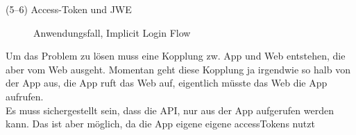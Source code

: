 \begin{labeling}{(5--6) Access-Token und JWE}


\end{labeling}

\begin{figure}[h]
    \scalebox{.5}{
        
    }
    \caption{Anwendungsfall, Implicit Login Flow}\label{ls: Extended Implicit Authorization TK}
\end{figure} \noindent
Um das Problem zu lösen muss eine Kopplung zw. App und Web entstehen, die aber vom Web ausgeht.
Momentan geht diese Kopplung ja irgendwie so halb von der App aus, die App ruft das Web auf,
eigentlich müsste das Web die App aufrufen.\\
Es muss sichergestellt sein, dass die API, nur aus der App aufgerufen werden kann.
Das ist aber möglich, da die App eigene eigene accessTokens nutzt
